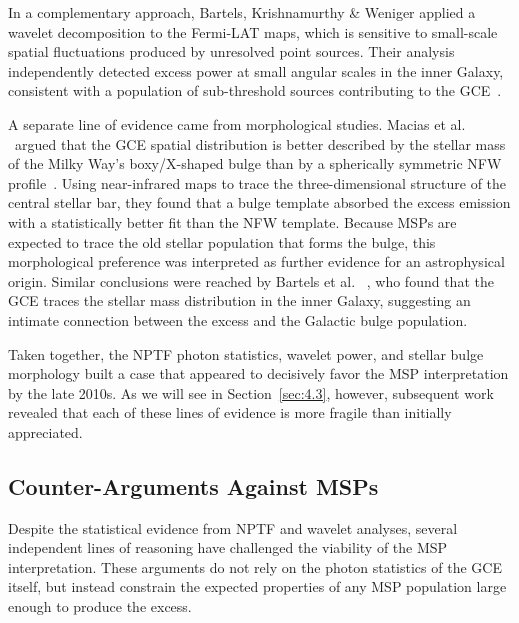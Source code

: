 In a complementary approach, Bartels, Krishnamurthy \& Weniger applied a wavelet decomposition to the Fermi-LAT maps, which is sensitive to small-scale spatial fluctuations produced by unresolved point sources.
Their analysis independently detected excess power at small angular scales in the inner Galaxy, consistent with a population of sub-threshold sources contributing to the GCE~\cite{Bartels:2015aea}.

A separate line of evidence came from morphological studies.
Macias et al.
\ argued that the GCE spatial distribution is better described by the stellar mass of the Milky Way's boxy/X-shaped bulge than by a spherically symmetric NFW profile~\cite{Macias:2016nev, Macias:2019omb}.
Using near-infrared maps to trace the three-dimensional structure of the central stellar bar, they found that a bulge template absorbed the excess emission with a statistically better fit than the NFW template.
Because MSPs are expected to trace the old stellar population that forms the bulge, this morphological preference was interpreted as further evidence for an astrophysical origin.
Similar conclusions were reached by Bartels et al.
\ \cite{Bartels:2018xom}, who found that the GCE traces the stellar mass distribution in the inner Galaxy, suggesting an intimate connection between the excess and the Galactic bulge population.

Taken together, the NPTF photon statistics, wavelet power, and stellar bulge morphology built a case that appeared to decisively favor the MSP interpretation by the late 2010s.
As we will see in Section~\ref{sec:4.3}, however, subsequent work revealed that each of these lines of evidence is more fragile than initially appreciated.

\subsection{Counter-Arguments Against MSPs}
\label{sec:4.2.3}

Despite the statistical evidence from NPTF and wavelet analyses, several independent lines of reasoning have challenged the viability of the MSP interpretation.
These arguments do not rely on the photon statistics of the GCE itself, but instead constrain the expected properties of any MSP population large enough to produce the excess.

